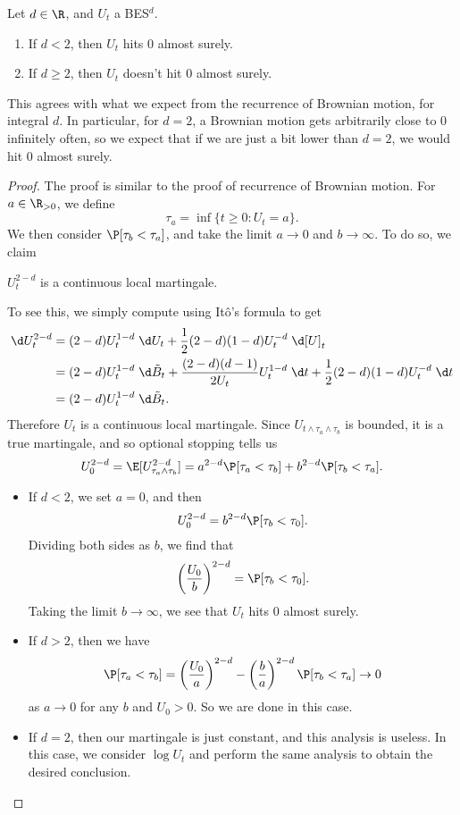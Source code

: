 \documentclass[a4paper]{article}
\begin{document}
\begin{prop}
  Let $d \in \R$, and $U_t$ a BES$^d$.
  \begin{enumerate}
    \item If $d < 2$, then $U_t$ hits $0$ almost surely.
    \item If $d \geq 2$, then $U_t$ doesn't hit $0$ almost surely.
  \end{enumerate}
\end{prop}
This agrees with what we expect from the recurrence of Brownian motion, for integral $d$. In particular, for $d = 2$, a Brownian motion gets arbitrarily close to $0$ infinitely often, so we expect that if we are just a bit lower than $d = 2$, we would hit $0$ almost surely.
\begin{proof}
  The proof is similar to the proof of recurrence of Brownian motion. For $a \in \R_{>0}$, we define
  \[
    \tau_a = \inf \{t \geq 0: U_t = a\}.
  \]
  We then consider $\P[\tau_b < \tau_a]$, and take the limit $a \to 0$ and $b \to \infty$. To do so, we claim
  \begin{claim}
    $U_t^{2 - d}$ is a continuous local martingale.
  \end{claim}

  To see this, we simply compute using It\^o's formula to get
  \begin{align*}
    \d U_t^{2 - d} &=  (2 - d) U_t^{1 - d} \;\d U_t + \frac{1}{2} (2 - d) (1 - d) U_t^{-d} \;\d [U]_t\\
    &= (2 - d) U_t^{1 - d} \;\d \tilde{B}_t + \frac{(2 - d)(d - 1)}{2 U_t} U_t^{1 - d}\;\d t + \frac{1}{2} (2 - d)(1 - d) U_t^{-d}\;\d t\\
    &= (2 - d) U_t^{1 - d}\;\d \tilde{B}_t.
  \end{align*}
  Therefore $U_t$ is a continuous local martingale. Since $U_{t \wedge \tau_a \wedge \tau_b}$ is bounded, it is a true martingale, and so optional stopping tells us
  \[
    U_0^{2 - d} = \E [U_{\tau_a \wedge \tau_b}^{2 - d}] = a^{2 - d} \P[\tau_a < \tau_b] + b^{2 - d} \P[\tau_b < \tau_a].
  \]
  \begin{itemize}
    \item If $d < 2$, we set $a = 0$, and then
      \[
        U_0^{2 - d} = b^{2 - d} \P[\tau_b < \tau_0].
      \]
      Dividing both sides as $b$, we find that
      \[
        \left(\frac{U_0}{b}\right)^{2 - d} = \P[\tau_b < \tau_0].
      \]
      Taking the limit $b \to \infty$, we see that $U_t$ hits $0$ almost surely.
    \item If $d > 2$, then we have
      \[
        \P[\tau_a < \tau_b] = \left(\frac{U_0}{a}\right)^{2 - d} - \left(\frac{b}{a}\right)^{2 - d} \P[\tau_b < \tau_a] \to 0
      \]
      as $a \to 0$ for any $b$ and $U_0 > 0$. So we are done in this case.
    \item If $d = 2$, then our martingale is just constant, and this analysis is useless. In this case, we consider $\log U_t$ and perform the same analysis to obtain the desired conclusion.\qedhere
  \end{itemize}
\end{proof}
\end{document}
